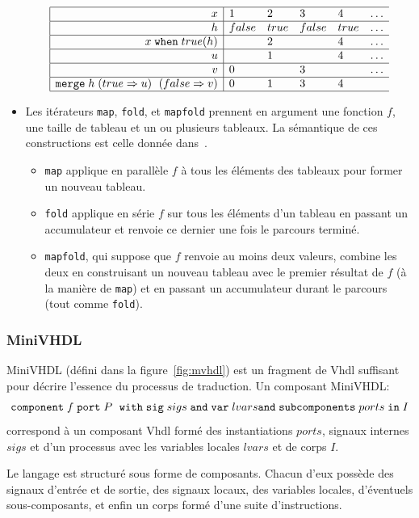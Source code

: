 \documentclass[a4paper]{article}
\newcommand{\minivhdl}{{\sc MiniVHDL}}
\newcommand{\vhdl}{{\sc Vhdl}}
\newcommand{\mybox}[1]{\mbox{\tt{#1}}}
\newcommand{\When}[3]{#1 \; \mybox{when} \; #2(#3)}
\newcommand{\Merges}[5]{\mybox{merge} \; #1 \; (#2 \Rightarrow #3) \; \
  (#4 \Rightarrow #5)}
\newcommand{\Component}[6]{\mybox{component} \; #1 \; \mybox{port} \; #2 \; \
  \mybox{with} \; \mybox{sig} \; #3 \; \mybox{and} \; \mybox{var} \; #4 \; \\
  \mybox{and} \; \mybox{subcomponents} \; #5 \; \mybox{in} \; #6}
\begin{document}
\begin{itemize}
\[
\begin{array}{|r|llllllllllllllllllllllllllll}
  \hline
  x & 1 & 2 & 3 & 4 & \dots \\
  \hline
  h & false & true & false & true & \dots \\
  \hline
  \When{x}{true}{h} & & 2 & & 4 & \dots \\
  \hline
  u &  & 1 & & 4 & \dots \\
  \hline
  v & 0 & & 3 & & \dots \\
  \hline
  \Merges{h}{true}{u}{false}{v} & 0 & 1 & 3 & 4 \\
  \hline
\end{array}
\]

\item
Les itérateurs \texttt{map}, \texttt{fold}, et \texttt{mapfold}
prennent en argument une fonction $f$, une taille de tableau et un ou
plusieurs tableaux. La sémantique de ces constructions est celle
donnée dans~\cite{lucy:genie00,morel-07-jes}.

\begin{itemize}
\item \texttt{map} applique en parallèle $f$ à tous les éléments des tableaux
  pour former un nouveau tableau.
\item \texttt{fold} applique en série $f$ sur tous les éléments d'un tableau en
  passant un accumulateur et renvoie ce dernier une fois le parcours terminé.
\item \texttt{mapfold}, qui suppose que $f$ renvoie au moins deux valeurs,
  combine les deux en construisant un nouveau tableau avec le premier résultat
  de $f$ (à la manière de \texttt{map}) et en passant un accumulateur durant le
  parcours (tout comme \texttt{fold}).
\end{itemize}
\end{itemize}

\subsubsection{MiniVHDL}

\minivhdl{} (défini dans la figure~\ref{fig:mvhdl})
est un fragment de \vhdl{} suffisant pour
décrire l'essence du processus de traduction. Un composant \minivhdl:
\[
\Component{f}{P}{sigs}{lvars}{ports}{I}
\]
correspond à un
composant \vhdl{} formé des instantiations $ports$, signaux internes $sigs$ et d'un
processus avec les variables locales $lvars$ et de corps $I$.

Le langage est structuré sous forme de composants. Chacun d'eux possède des
signaux d'entrée et de sortie, des signaux locaux, des variables locales, d'éventuels
sous-composants, et enfin un corps formé d'une suite d'instructions.
\end{document}
